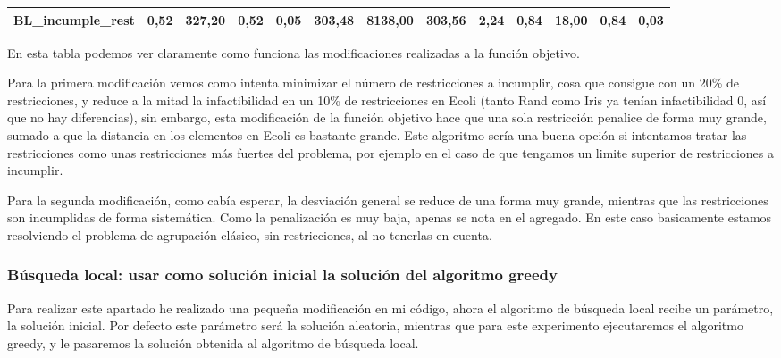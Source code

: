 \documentclass[12pt, spanish]{article}
\begin{document}
\begin{table}[H]
\begin{adjustwidth}{-1.9cm}{-1.9cm}
\begin{tabular}{|l|c|c|c|c|c|c|c|c|c|c|c|c|}
BL\_incumple\_rest                                      & 0,52                         & 327,20                         & 0,52                      & 0,05                   & 303,48                       & 8138,00                        & 303,56                    & 2,24                   & 0,84                         & 18,00                          & 0,84                      & 0,03               \\ \hline   
\end{tabular}

\end{adjustwidth}
\end{table}

En esta tabla podemos ver claramente como funciona las modificaciones realizadas a la función objetivo.

Para la primera modificación vemos como intenta minimizar el número de restricciones a incumplir, cosa que consigue con un 20\% de restricciones, y reduce a la mitad la infactibilidad en un 10\% de restricciones en Ecoli (tanto Rand como Iris ya tenían infactibilidad 0, así que no hay diferencias), sin embargo, esta modificación de la función objetivo hace que una sola restricción penalice de forma muy grande, sumado a que la distancia en los elementos en Ecoli es bastante grande. Este algoritmo sería una buena opción si intentamos tratar las restricciones como unas restricciones más fuertes del problema, por ejemplo en el caso de que tengamos un limite superior de restricciones a incumplir. 


Para la segunda modificación, como cabía esperar, la desviación general se reduce de una forma muy grande, mientras que las restricciones son incumplidas de forma sistemática. Como la penalización es muy baja, apenas se nota en el agregado. En este caso basicamente estamos resolviendo el problema de agrupación clásico, sin restricciones, al no tenerlas en cuenta.

\newpage

\subsubsection{Búsqueda local: usar como solución inicial la solución del algoritmo greedy}

Para realizar este apartado he realizado una pequeña modificación en mi código, ahora el algoritmo de búsqueda local recibe un parámetro, la solución inicial. Por defecto este parámetro será la solución aleatoria, mientras que para este experimento ejecutaremos el algoritmo greedy, y le pasaremos la solución obtenida al algoritmo de búsqueda local.
\end{document}
